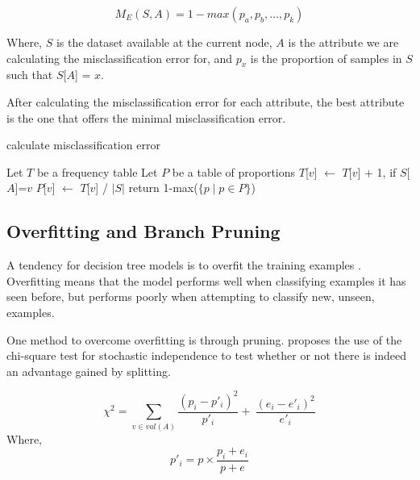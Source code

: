 \documentclass{IEEEtran}
\begin{document}
\begin{equation}
\label{misclassification-error-equation}
M_E(S,A) = 1 - max(p_a, p_b, ..., p_k) 
\end{equation}

Where, $S$ is the dataset available at the current node, $A$ is the
attribute we are calculating the misclassification error for, and $p_x$
is the proportion of samples in $S$ such that $S$[$A$] = $x$.

After calculating the misclassification error for each attribute, the
best attribute is the one that offers the minimal misclassification
error.

\begin{algorithm}
\caption{calculate misclassification error}
\begin{algorithmic}
\Statex {}
\State Let $T$ be a frequency table
\State Let $P$ be a table of proportions
    \State $T$[$v$] $\leftarrow$ $T$[$v$] + 1, if $S$[$A$]=$v$
  \EndFor
  \State $P$[$v$] $\leftarrow$ $T$[$v$] / $\lvert S \rvert$
\EndFor
\State return 1-max($\lbrace p \mid p \in P\rbrace$)

\end{algorithmic}
\end{algorithm}

\subsection{Overfitting and Branch Pruning}
A tendency for decision tree models is to overfit the training
examples \parencite{mitchell1997machine}. Overfitting means that the
model performs well when classifying examples it has seen before, but
performs poorly when attempting to classify new, unseen, examples.

One method to overcome overfitting is through
pruning. \parencite{quinlan1986induction} proposes the use of the
chi-square test for stochastic independence to test whether or not
there is indeed an advantage gained by splitting.

\begin{equation}
\label{chi-square-equation}
\chi^2 = \sum_{v\in val(A)}\frac{(p_i-p'_i)^2}{p'_i} + \
\frac{(e_i-e'_i)^2}{e'_i}
\end{equation}
Where,
\begin{equation}
\label{chi-square-helper-equation}
p'_i = p \times \frac{p_i+e_i}{p+e}
\end{equation}
\end{document}
